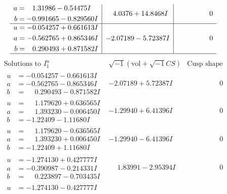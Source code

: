 \documentclass[1p]{elsarticle_modified}
\theoremstyle{definition}
\newcommand{\I}{\sqrt{-1}}
\begin{document}
$$\begin{array}{c|c|c}
\begin{aligned}
a &= \phantom{-}1.31986 - 0.54475 I \\
b &= -0.991665 - 0.829560 I\end{aligned}
 & \phantom{-}4.0376 + 14.8468 I & \phantom{-0.000000 } 0 \\ \hline\begin{aligned}
u &= -0.054257 + 0.661613 I \\
a &= -0.562765 + 0.865346 I \\
b &= \phantom{-}0.290493 + 0.871582 I\end{aligned}
 & -2.07189 - 5.72387 I & \phantom{-0.000000 } 0\\
 \hline 
 \end{array}$$\newpage$$\begin{array}{c|c|c}  
\text{Solutions to }I^u_{1}& \I (\text{vol} + \sqrt{-1}CS) & \text{Cusp shape}\\
 \hline 
\begin{aligned}
u &= -0.054257 - 0.661613 I \\
a &= -0.562765 - 0.865346 I \\
b &= \phantom{-}0.290493 - 0.871582 I\end{aligned}
 & -2.07189 + 5.72387 I & \phantom{-0.000000 } 0 \\ \hline\begin{aligned}
u &= \phantom{-}1.179620 + 0.636565 I \\
a &= \phantom{-}1.393230 - 0.006450 I \\
b &= -1.22409 - 1.11680 I\end{aligned}
 & -1.29940 + 6.41396 I & \phantom{-0.000000 } 0 \\ \hline\begin{aligned}
u &= \phantom{-}1.179620 - 0.636565 I \\
a &= \phantom{-}1.393230 + 0.006450 I \\
b &= -1.22409 + 1.11680 I\end{aligned}
 & -1.29940 - 6.41396 I & \phantom{-0.000000 } 0 \\ \hline\begin{aligned}
u &= -1.274130 + 0.427777 I \\
a &= -0.390987 - 0.214331 I \\
b &= \phantom{-}0.223897 - 0.703435 I\end{aligned}
 & \phantom{-}1.83991 - 2.95394 I & \phantom{-0.000000 } 0 \\ \hline\begin{aligned}
u &= -1.274130 - 0.427777 I \\

\end{aligned}
\end{array}$$
\end{document}
